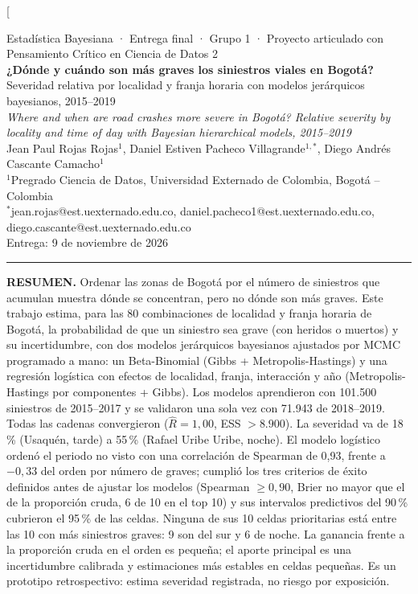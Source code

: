 \documentclass[10pt,twocolumn]{article}
\begin{document}
\twocolumn[{
\begin{center}
{\small Estadística Bayesiana · Entrega final · Grupo 1 · Proyecto articulado con Pensamiento Crítico en Ciencia de Datos 2}\\[6pt]
{\LARGE\bfseries ¿Dónde y cuándo son más graves los siniestros viales en Bogotá?}\\[3pt]
{\large Severidad relativa por localidad y franja horaria con modelos jerárquicos bayesianos, 2015--2019}\\[5pt]
{\large\itshape Where and when are road crashes more severe in Bogotá? Relative severity by locality and time of day with Bayesian hierarchical models, 2015--2019}\\[8pt]
Jean Paul Rojas Rojas$^{1}$, Daniel Estiven Pacheco Villagrande$^{1,*}$, Diego Andrés Cascante Camacho$^{1}$\\[2pt]
{\small $^{1}$Pregrado Ciencia de Datos, Universidad Externado de Colombia, Bogotá -- Colombia}\\
{\small $^{*}$jean.rojas@est.uexternado.edu.co, daniel.pacheco1@est.uexternado.edu.co, diego.cascante@est.uexternado.edu.co}\\[4pt]
{\small Entrega: 9 de noviembre de 2026}
\end{center}
\vspace{2pt}
\noindent\rule{\textwidth}{0.4pt}
\begin{small}
\noindent\textbf{RESUMEN.} Ordenar las zonas de Bogotá por el número de siniestros que acumulan muestra dónde se concentran, pero no dónde son más graves. Este trabajo estima, para las 80 combinaciones de localidad y franja horaria de Bogotá, la probabilidad de que un siniestro sea grave (con heridos o muertos) y su incertidumbre, con dos modelos jerárquicos bayesianos ajustados por MCMC programado a mano: un Beta-Binomial (Gibbs + Metropolis-Hastings) y una regresión logística con efectos de localidad, franja, interacción y año (Metropolis-Hastings por componentes + Gibbs). Los modelos aprendieron con 101.500 siniestros de 2015--2017 y se validaron una sola vez con 71.943 de 2018--2019. Todas las cadenas convergieron ($\widehat R=1{,}00$, ESS $>8.900$). La severidad va de 18\,\% (Usaquén, tarde) a 55\,\% (Rafael Uribe Uribe, noche). El modelo logístico ordenó el periodo no visto con una correlación de Spearman de 0,93, frente a $-0{,}33$ del orden por número de graves; cumplió los tres criterios de éxito definidos antes de ajustar los modelos (Spearman $\ge0{,}90$, Brier no mayor que el de la proporción cruda, 6 de 10 en el top 10) y sus intervalos predictivos del 90\,\% cubrieron el 95\,\% de las celdas. Ninguna de sus 10 celdas prioritarias está entre las 10 con más siniestros graves: 9 son del sur y 6 de noche. La ganancia frente a la proporción cruda en el orden es pequeña; el aporte principal es una incertidumbre calibrada y estimaciones más estables en celdas pequeñas. Es un prototipo retrospectivo: estima severidad registrada, no riesgo por exposición.

\end{small}}
\end{document}
